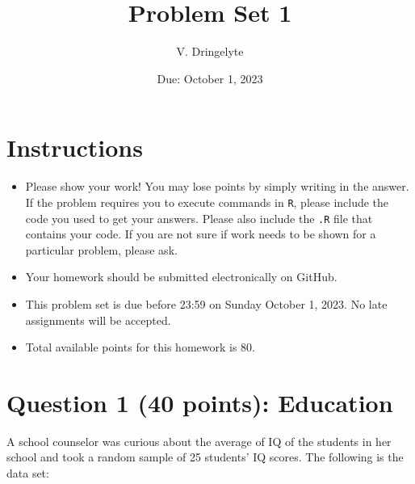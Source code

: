 \documentclass[12pt,letterpaper]{article}
\title{Problem Set 1}
\date{Due: October 1, 2023}
\author{V. Dringelyte}
\begin{document}
	\maketitle
	
	\section*{Instructions}
	\begin{itemize}
	\item Please show your work! You may lose points by simply writing in the answer. If the problem requires you to execute commands in \texttt{R}, please include the code you used to get your answers. Please also include the \texttt{.R} file that contains your code. If you are not sure if work needs to be shown for a particular problem, please ask.
\item Your homework should be submitted electronically on GitHub.
\item This problem set is due before 23:59 on Sunday October 1, 2023. No late assignments will be accepted.
\item Total available points for this homework is 80.
	\end{itemize}
	
	\vspace{1cm}
	\section*{Question 1 (40 points): Education}

A school counselor was curious about the average of IQ of the students in her school and took a random sample of 25 students' IQ scores. The following is the data set:\\
\vspace{.5cm}

  

\vspace{1cm}
\end{document}
